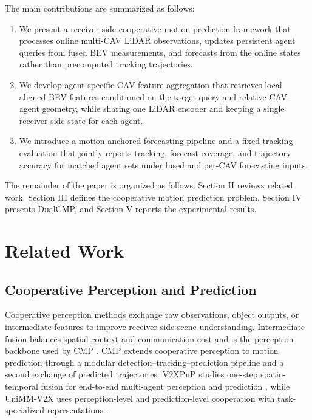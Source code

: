 \documentclass[lettersize,journal]{IEEEtran}
\begin{document}
The main contributions are summarized as follows:
\begin{enumerate}
\item We present a receiver-side cooperative motion prediction framework that processes online multi-CAV LiDAR observations, updates persistent agent queries from fused BEV measurements, and forecasts from the online states rather than precomputed tracking trajectories.
\item We develop agent-specific CAV feature aggregation that retrieves local aligned BEV features conditioned on the target query and relative CAV--agent geometry, while sharing one LiDAR encoder and keeping a single receiver-side state for each agent.
\item We introduce a motion-anchored forecasting pipeline and a fixed-tracking evaluation that jointly reports tracking, forecast coverage, and trajectory accuracy for matched agent sets under fused and per-CAV forecasting inputs.
\end{enumerate}

The remainder of the paper is organized as follows. Section II reviews related work. Section III defines the cooperative motion prediction problem, Section IV presents DualCMP, and Section V reports the experimental results.

\section{Related Work}
\subsection{Cooperative Perception and Prediction}

Cooperative perception methods exchange raw observations, object outputs, or intermediate features to improve receiver-side scene understanding. Intermediate fusion balances spatial context and communication cost and is the perception backbone used by CMP \cite{wang2025cmp}. CMP extends cooperative perception to motion prediction through a modular detection--tracking--prediction pipeline and a second exchange of predicted trajectories. V2XPnP studies one-step spatio-temporal fusion for end-to-end multi-agent perception and prediction \cite{zhou2025v2xpnp}, while UniMM-V2X uses perception-level and prediction-level cooperation with task-specialized representations \cite{souig2026unimm}.
\end{document}
